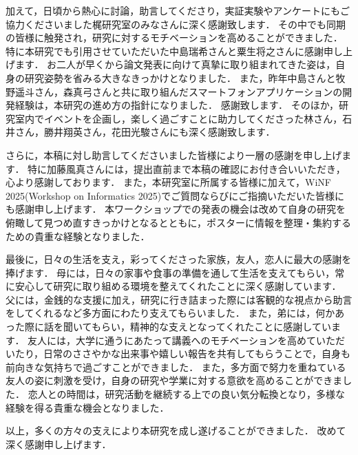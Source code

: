加えて，日頃から熱心に討論，助言してくださり，実証実験やアンケートにもご協力くださいました梶研究室のみなさんに深く感謝致します．
その中でも同期の皆様に触発され，研究に対するモチベーションを高めることができました．
特に本研究でも引用させていただいた中島瑞希さんと粟生将之さんに感謝申し上げます．
お二人が早くから論文発表に向けて真摯に取り組まれてきた姿は，自身の研究姿勢を省みる大きなきっかけとなりました．
また，昨年中島さんと牧野遥斗さん，森真弓さんと共に取り組んだスマートフォンアプリケーションの開発経験は，本研究の進め方の指針になりました．
感謝致します．
そのほか，研究室内でイベントを企画し，楽しく過ごすことに助力してくださった林さん，石井さん，勝井翔英さん，花田光駿さんにも深く感謝致します．


さらに，本稿に対し助言してくださいました皆様により一層の感謝を申し上げます．
特に加藤風真さんには，提出直前まで本稿の確認にお付き合いいただき，心より感謝しております．
また，本研究室に所属する皆様に加えて，WiNF 2025(Workshop on Informatics 2025)でご質問ならびにご指摘いただいた皆様にも感謝申し上げます．
本ワークショップでの発表の機会は改めて自身の研究を俯瞰して見つめ直すきっかけとなるとともに，ポスターに情報を整理・集約するための貴重な経験となりました．



最後に，日々の生活を支え，彩ってくださった家族，友人，恋人に最大の感謝を捧げます．
母には，日々の家事や食事の準備を通して生活を支えてもらい，常に安心して研究に取り組める環境を整えてくれたことに深く感謝しています．
父には，金銭的な支援に加え，研究に行き詰まった際には客観的な視点から助言をしてくれるなど多方面にわたり支えてもらいました．
また，弟には，何かあった際に話を聞いてもらい，精神的な支えとなってくれたことに感謝しています．
友人には，大学に通うにあたって講義へのモチベーションを高めていただいたり，日常のささやかな出来事や嬉しい報告を共有してもらうことで，自身も前向きな気持ちで過ごすことができました．
また，多方面で努力を重ねている友人の姿に刺激を受け，自身の研究や学業に対する意欲を高めることができました．
恋人との時間は，研究活動を継続する上での良い気分転換となり，多様な経験を得る貴重な機会となりました．

以上，多くの方々の支えにより本研究を成し遂げることができました．
改めて深く感謝申し上げます．





